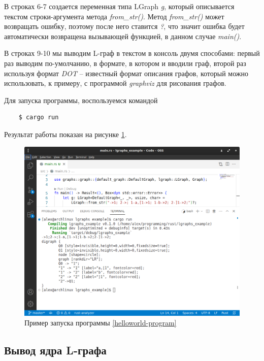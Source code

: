 В строках 6-7 создается переменная типа LGraph \emph{g}, который описывается текстом строки-аргумента
метода \emph{from\_str()}. Метод \emph{from\_str()} может возвращать ошибку, поэтому после него ставится \emph{?}, 
что значит ошибка будет автоматически возвращена вызывающей функцией, в данном случае \emph{main()}.

В строках 9-10 мы выводим L-граф в текстом в консоль двумя способами: первый раз выводим по-умолчанию,
в формате, в котором и вводили граф, второй раз используя формат \emph{DOT} -- известный формат описания графов,
который можно использовать, к примеру, с программой \emph{graphviz} для рисования графов. 

Для запуска программы, воспользуемся командой
\begin{verbatim}
    $ cargo run
\end{verbatim}
Результат работы показан на рисунке \ref{helloworld-out-image}.

\begin{figure}
    \centering
    \includegraphics[scale=0.4]{static_images/hello_world.png}
    \caption{Пример запуска программы \ref{helloworld-program}}
    \label{helloworld-out-image}
\end{figure}

\subsection{Вывод ядра L-графа}

\inputminted[linenos]{rust}{../lgraphs/examples/core11.rs} \label{core11-program}

